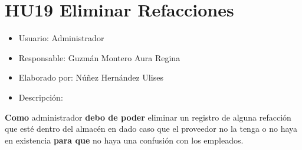 \section{HU19 Eliminar Refacciones}
\begin{itemize}
	\item Usuario: Administrador
	\item Responsable: Guzmán Montero Aura Regina
	\item Elaborado por: Núñez Hernández Ulises
	\item Descripción:\\
\end{itemize}

\textbf{Como} administrador \textbf{debo de poder} eliminar un registro de alguna refacción que esté dentro del almacén en dado caso que el proveedor no la tenga o no haya en existencia \textbf{para que} no haya una confusión con los empleados.